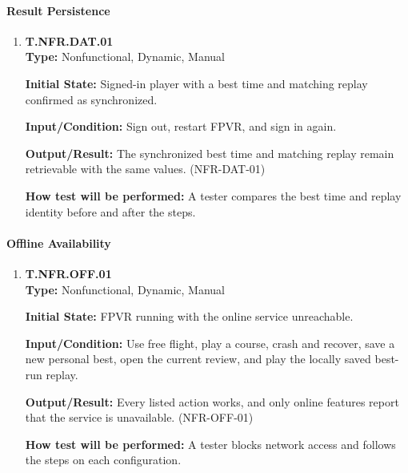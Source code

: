 \documentclass[12pt, titlepage]{article}
\begin{document}
{\sloppy
\paragraph{Result Persistence}

\begin{enumerate}

\item{\hypertarget{test-nfr-da01}{}\textbf{T.NFR.DAT.01}\\}
\textbf{Type:} Nonfunctional, Dynamic, Manual

\textbf{Initial State:} Signed-in player with a best time and matching replay
confirmed as synchronized.

\textbf{Input/Condition:} Sign out, restart FPVR, and sign in again.

\textbf{Output/Result:} The synchronized best time and matching replay remain
retrievable with the same values. (\mbox{NFR-DAT-01})

\textbf{How test will be performed:} A tester compares the best time and replay
identity before and after the steps.

\end{enumerate}

\paragraph{Offline Availability}

\begin{enumerate}

\item{\hypertarget{test-nfr-off-01}{}\textbf{T.NFR.OFF.01}\\}
\textbf{Type:} Nonfunctional, Dynamic, Manual

\textbf{Initial State:} FPVR running with the online service unreachable.

\textbf{Input/Condition:} Use free flight, play a course, crash and recover, save a
new personal best, open the current review, and play the locally saved best-run replay.

\textbf{Output/Result:} Every listed action works, and only online features report that
the service is unavailable. (\mbox{NFR-OFF-01})

\textbf{How test will be performed:} A tester blocks network access and follows the
steps on each configuration.

\end{enumerate}
\par}
\end{document}
